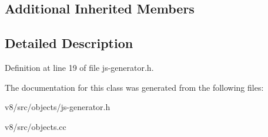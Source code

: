\subsection*{Additional Inherited Members}


\subsection{Detailed Description}


Definition at line 19 of file js-\/generator.\+h.



The documentation for this class was generated from the following files\+:\begin{DoxyCompactItemize}
\item 
v8/src/objects/js-\/generator.\+h\item 
v8/src/objects.\+cc\end{DoxyCompactItemize}
